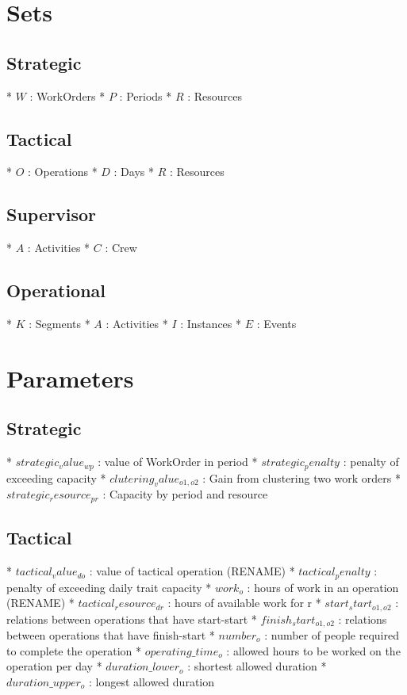 \section{Sets}

\subsection{Strategic}
* $W$                        : WorkOrders
* $P$                        : Periods
* $R$                        : Resources
\subsection{Tactical}
* $O$                        : Operations
* $D$                        : Days
* $R$                        : Resources
\subsection{Supervisor}
* $A$                        : Activities 
* $C$                        : Crew
\subsection{Operational}
* $K$                        : Segments 
* $A$                        : Activities 
* $I$                        : Instances
* $E$                        : Events

\section{Parameters}

\subsection{Strategic}
* $strategic_value_{wp}$     : value of WorkOrder in period
* $strategic_penalty$     : penalty of exceeding capacity
* $clutering_value_{o1, o2}$          : Gain from clustering two work orders
* $strategic_resource_{pr}$  : Capacity by period and resource
\subsection{Tactical}
* $tactical_value_{do}$      : value of tactical operation (RENAME)
* $tactical_penalty$         : penalty of exceeding daily trait capacity
* $work_{o}$                : hours of work in an operation (RENAME)
* $tactical_resource_{dr}$   : hours of available work for r
* $start_start_{o1, o2}$     : relations between operations that have start-start
* $finish_start_{o1, o2}$    : relations between operations that have finish-start
* $number_{o}$                 : number of people required to complete the operation
* $operating\_time_{o}$          : allowed hours to be worked on the operation per day
* $duration\_lower_{o}$        : shortest allowed duration
* $duration\_upper_{o}$        : longest allowed duration
